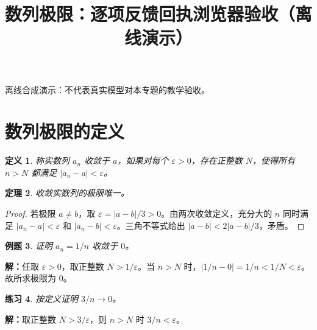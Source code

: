 \documentclass[UTF8,fontset=fandol,11pt]{ctexart}
\title{数列极限：逐项反馈回执浏览器验收（离线演示）}
\date{}
\newtheorem{definition}{定义}[section]
\newtheorem{theorem}[definition]{定理}
\newtheorem{example}[definition]{例题}
\newtheorem{exercise}[definition]{练习}
\begin{document}
\maketitle
\par\noindent 离线合成演示：不代表真实模型对本专题的教学验收。\par
\section{数列极限的定义}\label{sec:S01}
\begin{definition}
称实数列 $a_n$ 收敛于 $a$，如果对每个 $\varepsilon>0$，存在正整数 $N$，使得所有 $n>N$ 都满足 $|a_n-a|<\varepsilon$。
\end{definition}
\begin{theorem}
收敛实数列的极限唯一。
\end{theorem}
\begin{proof}
若极限 $a\ne b$，取 $\varepsilon=|a-b|/3>0$。由两次收敛定义，充分大的 $n$ 同时满足 $|a_n-a|<\varepsilon$ 和 $|a_n-b|<\varepsilon$。三角不等式给出 $|a-b|<2|a-b|/3$，矛盾。
\end{proof}
\begin{example}
证明 $a_n=1/n$ 收敛于 $0$。
\end{example}
\par\noindent\textbf{解：}任取 $\varepsilon>0$，取正整数 $N>1/\varepsilon$。当 $n>N$ 时，$|1/n-0|=1/n<1/N<\varepsilon$。故所求极限为 $0$。\par
\begin{exercise}
\label{mathagent:exercise:0cc0e7ee849eb730aacd59475ce492febad40593b04fd779ce32c70f94e1140f}
按定义证明 $3/n\to0$。
\end{exercise}
\par\noindent\textbf{解：}取正整数 $N>3/\varepsilon$，则 $n>N$ 时 $3/n<\varepsilon$。\par
\end{document}
